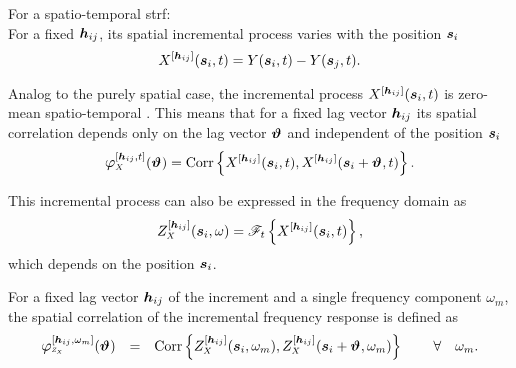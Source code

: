 For a spatio-temporal  \acrshort*{strf}: \\
For a fixed $\bm{h}_{ij}$, its spatial incremental process varies with the position $\bm{s}_{ i }$
\begin{equation*}
	X^{ \left[  \bm{h}_{ij}  \right] } ( \bm{s}_{ i }, t ) = Y (  \bm{s}_{ i }, t  ) - Y (  \bm{s}_{ j }, t ) .
\end{equation*}

Analog to the purely spatial case, the incremental process $X^{ \left[  \bm{h}_{ij}  \right] } ( \bm{s}_{ i }, t ) $ is zero-mean spatio-temporal . This means that for a fixed lag vector $\bm{h}_{ij}$ its spatial correlation depends only on the lag vector $\bm{ \vartheta }_{}$ and independent of the position $\bm{s}_{ i }$
\begin{equation*}
	\acfunivariate{ X }{ \lagvec{ ij }, t }{ \lagvecinc{} } = \Corr{ \SRFinc{ \lagvec{ij} } ( \pos{i}, t ) ,  \SRFinc{ \lagvec{ij} } ( \pos{i} + \lagvecinc{}, t ) } .
\end{equation*}

This incremental process can also be expressed in the frequency domain as 
\begin{equation*}
	\SRFincfreq{ \lagvec{ ij } } ( \pos{i}, \omega ) = \ft{t}{ \SRFinc{ \lagvec{ij} } ( \pos{i}, t ) },
\end{equation*}
which depends on the position $\bm{s}_{ i }$.

For a fixed lag vector $\bm{h}_{ ij }$ of the increment and a single frequency component $\omega_{m}$, the spatial correlation of the incremental frequency response is defined as 
\begin{equation*}
	\begin{matrix}
		\acfunivariate{ \SFresponse{ X } }{ \lagvec{ ij }, \omega_{m} }{ \lagvecinc{} }  
		& = 
		& \Corr{ \SRFincfreq{ \lagvec{ ij } } ( \pos{i}, \omega_{m} ), \SRFincfreq{ \lagvec{ ij } } ( \pos{i} + \lagvecinc{}, \omega_{m} )  } 
		&  \text{ }
		& \forall 
		& \omega_{m}.\\
	\end{matrix}
\end{equation*}

%

